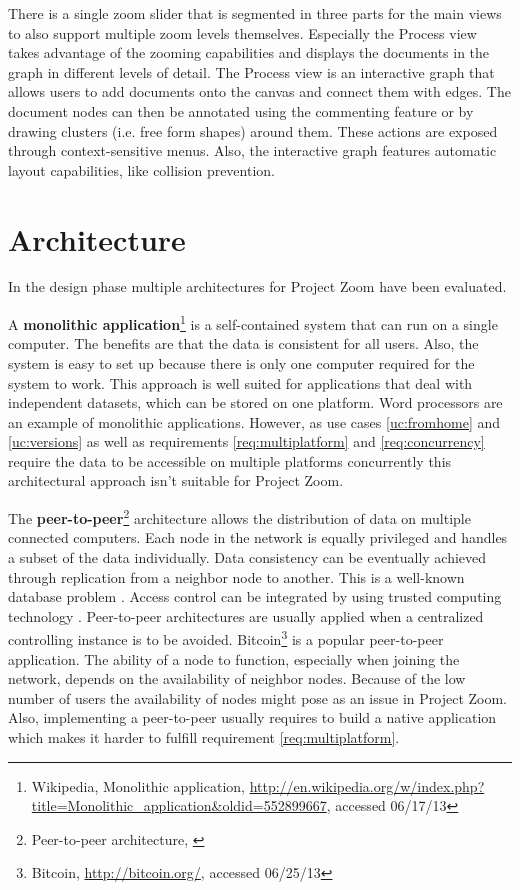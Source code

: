 There is a single zoom slider that is segmented in three parts for the main views to also support multiple zoom levels themselves. Especially the Process view takes advantage of the zooming capabilities and displays the documents in the graph in different levels of detail. 
The Process view is an interactive graph that allows users to add documents onto the canvas and connect them with edges. The document nodes can then be annotated using the commenting feature or by drawing clusters (i.e. free form shapes) around them. These actions are exposed through context-sensitive menus. Also, the interactive graph features automatic layout capabilities, like collision prevention.

\section{Architecture}
In the design phase multiple architectures for Project Zoom have been evaluated. 

A \textbf{monolithic application}\footnote{Wikipedia, Monolithic application, \url{http://en.wikipedia.org/w/index.php?title=Monolithic_application&oldid=552899667}, accessed 06/17/13} is a self-contained system that can run on a single computer. The benefits are that the data is consistent for all users. Also, the system is easy to set up because there is only one computer required for the system to work. This approach is well suited for applications that deal with independent datasets, which can be stored on one platform. Word processors are an example of monolithic applications. However, as use cases \ref{uc:fromhome} and \ref{uc:versions} as well as requirements \ref{req:multiplatform} and \ref{req:concurrency} require the data to be accessible on multiple platforms concurrently this architectural approach isn't suitable for Project Zoom.

The \textbf{peer-to-peer}\footnote{Peer-to-peer architecture, \cite{Schollmeier_2001}} architecture allows the distribution of data on multiple connected computers. Each node in the network is equally privileged and handles a subset of the data individually. Data consistency can be eventually achieved through replication from a neighbor node to another. This is a well-known database problem \cite{Gray_1996}. Access control can be integrated by using trusted computing technology \cite{Sandhu_2005}. Peer-to-peer architectures are usually applied when a centralized controlling instance is to be avoided. Bitcoin\footnote{Bitcoin, \url{http://bitcoin.org/}, accessed 06/25/13} is a popular peer-to-peer application. The ability of a node to function, especially when joining the network, depends on the availability of neighbor nodes. Because of the low number of users the availability of nodes might pose as an issue in Project Zoom. Also, implementing a peer-to-peer usually requires to build a native application which makes it harder to fulfill requirement \ref{req:multiplatform}.

